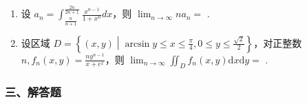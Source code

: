 \documentclass[12pt, a4paper]{ctexart}
\begin{document}
\begin{enumerate}[start=20]
    \item 设 $ a_{n}=\int_{\frac{n}{n+1}}^{\frac{2n}{2n+1}}\frac{x^{n-1}}{1+x^{n}}dx $，则 $ \lim_{n\to\infty}na_{n}= $ \underline{\hspace{2cm}}.

    \item 设区域 $ D=\left\{(x,y)\middle|\arcsin y\leq x\leq\frac{\pi}{4},0\leq y\leq\frac{\sqrt{2}}{2}\right\} $，对正整数 $ n,f_{n}(x,y)=\frac{ny^{n-1}}{x+e^{x}} $，则 $ \lim_{n\to\infty}\iint_{D}f_{n}(x,y)\mathrm{d}x\mathrm{d}y= $ \underline{\hspace{2cm}}.
\end{enumerate}

\subsubsection*{三、解答题}
\end{document}
